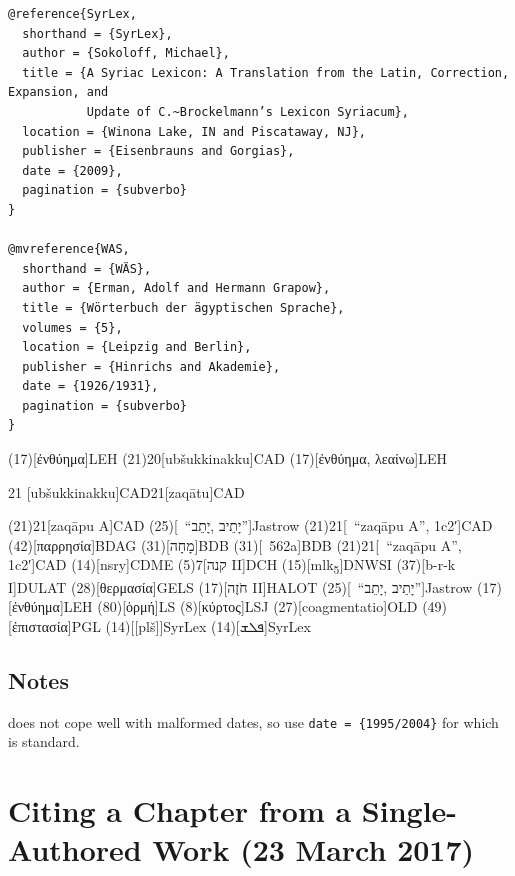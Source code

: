 \documentclass[a4paper]{article}
\begin{document}
\begin{verbatim}
@reference{SyrLex,
  shorthand = {SyrLex},
  author = {Sokoloff, Michael},
  title = {A Syriac Lexicon: A Translation from the Latin, Correction, Expansion, and
           Update of C.~Brockelmann’s Lexicon Syriacum},
  location = {Winona Lake, IN and Piscataway, NJ},
  publisher = {Eisenbrauns and Gorgias},
  date = {2009},
  pagination = {subverbo}
}

@mvreference{WAS,
  shorthand = {WÄS},
  author = {Erman, Adolf and Hermann Grapow},
  title = {Wörterbuch der ägyptischen Sprache},
  volumes = {5},
  location = {Leipzig and Berlin},
  publisher = {Hinrichs and Akademie},
  date = {1926/1931},
  pagination = {subverbo}
}
\end{verbatim}

\examplecite(17)[ἐνθύημα]{LEH}
\examplevolcite(21){20}[ubšukkinakku]{CAD}
\examplecite(17)[ἐνθύημα, λεαίνω]{LEH}
\begin{fverbcite}{21}
  [ubšukkinakku]{CAD}{21}[zaqātu]{CAD}
\end{fverbcite}
\examplevolcite(21){21}[zaqāpu A]{CAD}
\examplecite(25)[\sv~\mkbibquote{יָתֵיב ,יָתֵב}]{Jastrow}
\examplevolcite(21){21}[\sv~\mkbibquote{zaqāpu A}, 1c2′]{CAD}
\examplecite(42)[παρρησία]{BDAG}
\examplecite(31)[מָחָה]{BDB}
\examplecite(31)[\nopp 562a]{BDB}
\examplevolcite(21){21}[\sv~\mkbibquote{zaqāpu A}, 1c2′]{CAD}
\examplecite(14)[nsry]{CDME}
\examplevolcite(5){7}[קנה II]{DCH}
\examplecite(15)[mlk\textsubscript{5}]{DNWSI}
\examplecite(37)[b-r-k I]{DULAT}
\examplecite(28)[θερμασία]{GELS}
\examplecite(17)[חֹזֶה II]{HALOT}
\examplecite(25)[\sv~\mkbibquote{יָתֵיב ,יָתֵב}]{Jastrow}
\examplecite(17)[ἐνθύημα]{LEH}
\examplecite(80)[ὁρμή]{LS}
\examplecite(8)[κύρτος]{LSJ}
\examplecite(27)[coagmentatio]{OLD}
\examplecite(49)[ἐπιστασία]{PGL}
\examplecite(14)[\mkbibbrackets{plš}]{SyrLex}
\examplecite(14)[ܦܠܫ]{SyrLex}
\begin{verbcite}
  \nocite{BAG, BAGD, CHD, HAL, HED, KBL, Lane, LexSyr, WAS}
\end{verbcite}
\exampleabbreviations
{}

\subsection{Notes}

 does not cope well with malformed dates, so use
\verb+date = {1995/2004}+ for \cite{HAL} which is standard.

\section{Citing a Chapter from a Single-Authored Work (23 March 2017)}
\end{document}

